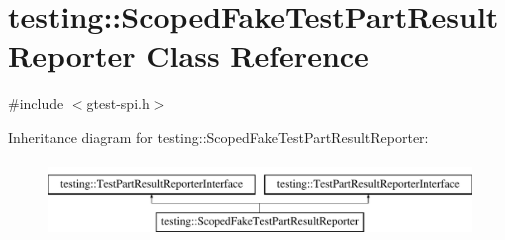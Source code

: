 \hypertarget{classtesting_1_1_scoped_fake_test_part_result_reporter}{\section{testing\-:\-:Scoped\-Fake\-Test\-Part\-Result\-Reporter Class Reference}
\label{classtesting_1_1_scoped_fake_test_part_result_reporter}
}


{\ttfamily \#include $<$gtest-\/spi.\-h$>$}

Inheritance diagram for testing\-:\-:Scoped\-Fake\-Test\-Part\-Result\-Reporter\-:\begin{figure}[H]
\begin{center}
\leavevmode
\includegraphics[height=2.000000cm]{classtesting_1_1_scoped_fake_test_part_result_reporter}
\end{center}
\end{figure}
